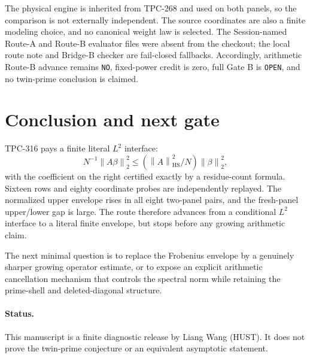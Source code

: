 \documentclass[10pt,a4paper]{article}
\newcommand{\HS}{\operatorname{HS}}
\newcommand{\norm}[1]{\left\lVert #1\right\rVert}
\begin{document}
The physical engine is inherited from TPC-268 and used on both panels, so the
comparison is not externally independent.  The source coordinates are also a
finite modeling choice, and no canonical weight law is selected.  The
Session-named Route-A and Route-B evaluator files were absent from the
checkout; the local route note and Bridge-B checker are fail-closed fallbacks.
Accordingly, arithmetic Route-B advance remains \texttt{NO}, fixed-power credit is
zero, full Gate B is \texttt{OPEN}, and no twin-prime conclusion is claimed.

\section{Conclusion and next gate}

TPC-316 pays a finite literal $L^2$ interface:
\[
 N^{-1}\norm{A\beta}_2^2
 \leq (\norm{A}_{\HS}^2/N)\norm{\beta}_2^2,
\]
with the coefficient on the right certified exactly by a residue-count
formula.  Sixteen rows and eighty coordinate probes are independently
replayed.  The normalized upper envelope rises in all eight two-panel pairs,
and the fresh-panel upper/lower gap is large.  The route therefore advances
from a conditional $L^2$ interface to a literal finite envelope, but stops
before any growing arithmetic claim.

The next minimal question is to replace the Frobenius envelope by a genuinely
sharper growing operator estimate, or to expose an explicit arithmetic
cancellation mechanism that controls the spectral norm while retaining the
prime-shell and deleted-diagonal structure.

\paragraph{Status.}
This manuscript is a finite diagnostic release by Liang Wang (HUST).  It does
not prove the twin-prime conjecture or an equivalent asymptotic statement.


\begingroup\small

\endgroup
\end{document}
